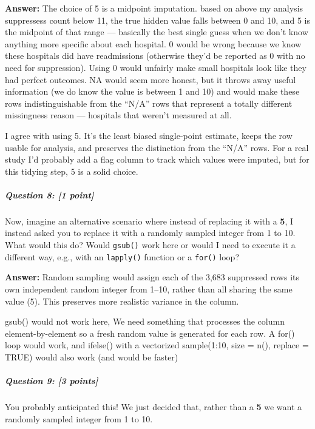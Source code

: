 \documentclass[
]{article}
\begin{document}
\textbf{Answer:} The choice of 5 is a midpoint imputation. based on
above my analysis suppressess count below 11, the true hidden value
falls between 0 and 10, and 5 is the midpoint of that range ---
basically the best single guess when we don't know anything more
specific about each hospital. 0 would be wrong because we know these
hospitals did have readmissions (otherwise they'd be reported as 0 with
no need for suppression). Using 0 would unfairly make small hospitals
look like they had perfect outcomes. NA would seem more honest, but it
throws away useful information (we do know the value is between 1 and
10) and would make these rows indistinguishable from the ``N/A'' rows
that represent a totally different missingness reason --- hospitals that
weren't measured at all.

I agree with using 5. It's the least biased single-point estimate, keeps
the row usable for analysis, and preserves the distinction from the
``N/A'' rows. For a real study I'd probably add a flag column to track
which values were imputed, but for this tidying step, 5 is a solid
choice.

\subparagraph{\texorpdfstring{\textbf{Question 8}: {[}1
point{]}}{Question 8: {[}1 point{]}}}\label{question-8-1-point}

Now, imagine an alternative scenario where instead of replacing it with
a \textbf{5}, I instead asked you to replace it with a randomly sampled
integer from 1 to 10. What would this do? Would \texttt{gsub()} work
here or would I need to execute it a different way, e.g., with an
\texttt{lapply()} function or a \texttt{for()} loop?

\textbf{Answer:} Random sampling would assign each of the 3,683
suppressed rows its own independent random integer from 1--10, rather
than all sharing the same value (5). This preserves more realistic
variance in the column.

gsub() would not work here, We need something that processes the column
element-by-element so a fresh random value is generated for each row. A
for() loop would work, and ifelse() with a vectorized sample(1:10, size
= n(), replace = TRUE) would also work (and would be faster)

\subparagraph{\texorpdfstring{\textbf{Question 9}: {[}3
points{]}}{Question 9: {[}3 points{]}}}\label{question-9-3-points}

You probably anticipated this! We just decided that, rather than a
\textbf{5} we want a randomly sampled integer from 1 to 10.
\end{document}
